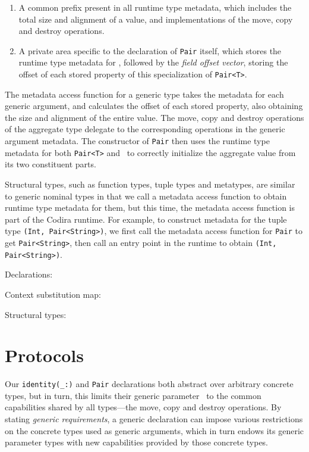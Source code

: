 \documentclass[../generics]{subfiles}
\begin{document}
\begin{enumerate}
\item A common prefix present in all runtime type metadata, which includes the total size and alignment of a value, and implementations of the move, copy and destroy operations.
\item A private area specific to the declaration of \texttt{Pair} itself, which stores the runtime type metadata for \tT, followed by the \emph{field offset vector}, storing the offset of each stored property of this specialization of \texttt{Pair<T>}.
\end{enumerate}

The metadata access function for a generic type takes the metadata for each generic argument, and calculates the offset of each stored property, also obtaining the size and alignment of the entire value. The move, copy and destroy operations of the aggregate type delegate to the corresponding operations in the generic argument metadata. The constructor of \texttt{Pair} then uses the runtime type metadata for both \texttt{Pair<T>} and \tT\ to correctly initialize the aggregate value from its two constituent parts.

Structural types, such as function types, tuple types and metatypes, are similar to generic nominal types in that we call a metadata access function to obtain runtime type metadata for them, but this time, the metadata access function is part of the Codira runtime. For example, to construct metadata for the tuple type \texttt{(Int, Pair<String>)}, we first call the metadata access function for \texttt{Pair} to get \texttt{Pair<String>}, then call an entry point in the runtime to obtain \texttt{(Int, Pair<String>)}.

\begin{MoreDetails}
\item Declarations: 
\item Context substitution map: 
\item Structural types: 
\end{MoreDetails}

\section{Protocols}\label{intro protocols}

Our \verb|identity(_:)| and \texttt{Pair} declarations both abstract over arbitrary concrete types, but in turn, this limits their generic parameter \tT\ to the common capabilities shared by all types---the move, copy and destroy operations. By stating \emph{generic requirements}, a generic declaration can impose various restrictions on the concrete types used as generic arguments, which in turn endows its generic parameter types with new capabilities provided by those concrete types.
\end{document}
